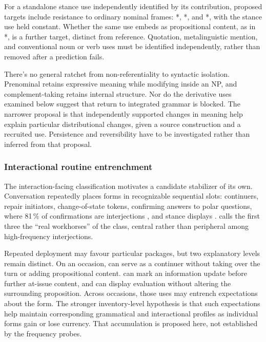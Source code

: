 \documentclass[12pt]{article}
\begin{document}
For a standalone stance use independently identified by its contribution, proposed targets include resistance to ordinary nominal frames: *, *, and *, with the stance use held constant. Whether the same use embeds as propositional content, as in *, is a further target, distinct from reference. Quotation, metalinguistic mention, and conventional noun or verb uses must be identified independently, rather than removed after a prediction fails.

There's no general ratchet from non-referentiality to syntactic isolation. Prenominal  retains expressive meaning while modifying inside an NP, and complement-taking  retains internal structure. Nor do the derivative uses examined below suggest that return to integrated grammar is blocked. The narrower proposal is that independently supported changes in meaning help explain particular distributional changes, given a source construction and a recruited use. Persistence and reversibility have to be investigated rather than inferred from that proposal.

\subsubsection{Interactional routine entrenchment}

The interaction-facing classification motivates a candidate stabilizer of its own. Conversation repeatedly places forms in recognizable sequential slots: continuers, repair initiators, change-of-state tokens, confirming answers to polar questions, where 81\,\% of confirmations are interjections \citep[195]{stivers2019}, and stance displays \citep[189--190]{dingemanse2020}. \textcite[257--258]{dingemanse2024} calls the first three the \enquote{real workhorses} of the class, central rather than peripheral among high-frequency interjections.

Repeated deployment may favour particular packages, but two explanatory levels remain distinct. On an occasion,  can serve as a continuer without taking over the turn or adding propositional content.  can mark an information update before further at-issue content, and  can display evaluation without altering the surrounding proposition. Across occasions, those uses may entrench expectations about the form. The stronger inventory-level hypothesis is that such expectations help maintain corresponding grammatical and interactional profiles as individual forms gain or lose currency. That accumulation is proposed here, not established by the frequency probes.
\end{document}
